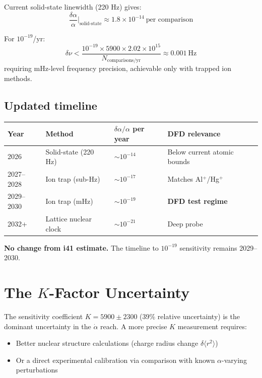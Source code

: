 \documentclass[11pt,a4paper]{article}
\begin{document}
Current solid-state linewidth (220 Hz) gives:
\begin{equation}
\frac{\delta\alpha}{\alpha}\bigg|_{\text{solid-state}} \approx 1.8 \times 10^{-14}~\text{per comparison}
\end{equation}

For $10^{-19}$/yr:
\begin{equation}
\delta\nu < \frac{10^{-19} \times 5900 \times 2.02 \times 10^{15}}{N_{\text{comparisons/yr}}} \approx 0.001~\text{Hz}
\end{equation}
requiring mHz-level frequency precision, achievable only with trapped ion methods.

\subsection{Updated timeline}

\begin{center}
\begin{tabular}{llll}
\toprule
\textbf{Year} & \textbf{Method} & \textbf{$\delta\alpha/\alpha$ per year} & \textbf{DFD relevance} \\
\midrule
2026 & Solid-state (220 Hz) & $\sim 10^{-14}$ & Below current atomic bounds \\
2027--2028 & Ion trap (sub-Hz) & $\sim 10^{-17}$ & Matches Al$^+$/Hg$^+$ \\
2029--2030 & Ion trap (mHz) & $\sim 10^{-19}$ & \textbf{DFD test regime} \\
2032+ & Lattice nuclear clock & $\sim 10^{-21}$ & Deep probe \\
\bottomrule
\end{tabular}
\end{center}

\textbf{No change from i41 estimate.} The timeline to $10^{-19}$ sensitivity remains 2029--2030.

\section{The $K$-Factor Uncertainty}

The sensitivity coefficient $K = 5900 \pm 2300$ (39\% relative uncertainty) is the dominant uncertainty in the $\dot{\alpha}$ reach. A more precise $K$ measurement requires:
\begin{itemize}
\item Better nuclear structure calculations (charge radius change $\delta\langle r^2\rangle$)
\item Or a direct experimental calibration via comparison with known $\alpha$-varying perturbations
\end{itemize}
\end{document}

